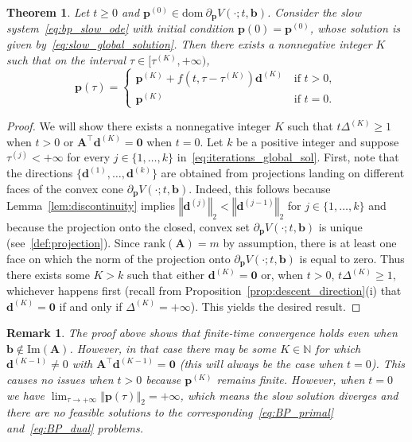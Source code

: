 \documentclass[11pt]{article}
\numberwithin{prop}{section}
\numberwithin{lem}{section}
\newtheorem{rem}{Remark}[section]
\numberwithin{rem}{section}
\numberwithin{cor}{section}
\newtheorem{thm}{Theorem}[section]
\numberwithin{thm}{section}
\numberwithin{defn}{section}
\numberwithin{fact}{section}
\theoremstyle{plain}
\def\bb {\boldsymbol{b}}
\def\bd {\boldsymbol{d}}
\def\bp {\boldsymbol{p}}
\newcommand{\normtwo}[1]{\left\Vert{#1} \right\Vert_{2}}
\newcommand{\matr}[1]{\bm{#1}}
\def\dom {\mathrm{dom~}}    %
\newcommand{\rank}[1]{\mathrm{rank}({#1})}
\def\Atop {\matr{A}^{\top}}
\begin{document}
\begin{thm}\label{thm:finite_time}
Let $t \geqslant 0$ and $\bp^{(0)} \in \dom \partial_{\bp}V(\cdot;t,\bb)$. Consider the slow system~\eqref{eq:bp_slow_ode} with initial condition $\bp(0) = \bp^{(0)}$, whose solution is given by~\eqref{eq:slow_global_solution}. Then there exists a nonnegative integer $K$ such that on the interval $\tau \in [\tau^{(K)},+\infty)$,
\[
\bp(\tau) = \begin{cases}
\bp^{(K)} + f(t,\tau-\tau^{(K)})\bd^{(K)} &\, \text{if $t>0$}, \\
\bp^{(K)} &\,\text{if $t=0$}.
\
\end{cases}
\]
\end{thm}
\begin{proof}
We will show there exists a nonnegative integer $K$ such that $t\Delta^{(K)} \geqslant 1$ when $t>0$ or $\Atop\bd^{(K)} = \boldsymbol{0}$ when $t = 0$. Let $k$ be a positive integer and suppose $\tau^{(j)} < +\infty$ for every $j \in \{1,\dots,k\}$ in~\eqref{eq:iterations_global_sol}. First, note that the directions $\{\bd^{(1)},\dots,\bd^{(k)}\}$ are obtained from projections landing on different faces of the convex cone $\partial_{\bp} V(\cdot;t,\bb)$. Indeed, this follows because Lemma~\ref{lem:discontinuity} implies $\normtwo{\bd^{(j)}} < \normtwo{\bd^{(j-1)}}$ for $j \in \{1,\dots,k\}$ and because the projection onto the closed, convex set $\partial_{\bp} V(\cdot;t,\bb)$ is unique (see~\ref{def:projection}). Since $\rank{\matr{A}} = m$ by assumption, there is at least one face on which the norm of the projection onto $\partial_{\bp} V(\cdot;t,\bb)$ is equal to zero. Thus there exists some $K > k$ such that either $\bd^{(K)} = \boldsymbol{0}$ or, when $t>0$, $t\Delta^{(K)} \geqslant 1$, whichever happens first (recall from Proposition~\ref{prop:descent_direction}(i) that $\bd^{(K)} = \boldsymbol{0}$ if and only if $\Delta^{(K)} = +\infty$). This yields the desired result.
\end{proof}

\begin{rem}\label{rem:finite_time_holds}
The proof above shows that finite-time convergence holds even when $\bb \notin \text{Im}(\matr{A})$. However, in that case there may be some $K \in \mathbb{N}$ for which $\bd^{(K-1)} \neq 0$ with $\Atop\bd^{(K-1)} = \boldsymbol{0}$ (this will always be the case when $t=0$). This causes no issues when $t>0$ because $\bp^{(K)}$ remains finite. However, when $t=0$ we have $\lim_{\tau \to +\infty}\normtwo{\bp(\tau)} = +\infty$, which means the slow solution diverges and there are no feasible solutions to the corresponding~\eqref{eq:BP_primal} and~\eqref{eq:BP_dual} problems.
\end{rem} 
\end{document}

